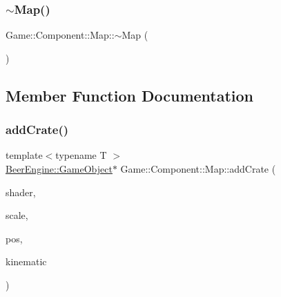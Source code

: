 \mbox{\label{class_game_1_1_component_1_1_map_a275fd057bb57bdfc5c35651d8cc3a464}} 
\subsubsection{\texorpdfstring{$\sim$\+Map()}{~Map()}}
{\footnotesize\ttfamily Game\+::\+Component\+::\+Map\+::$\sim$\+Map (\begin{DoxyParamCaption}{ }\end{DoxyParamCaption})}



\subsection{Member Function Documentation}
\mbox{\label{class_game_1_1_component_1_1_map_a860f2c45a23d20303aa5e04261ac462d}} 
\subsubsection{\texorpdfstring{add\+Crate()}{addCrate()}}
{\footnotesize\ttfamily template$<$typename T $>$ \\
\mbox{\hyperlink{class_beer_engine_1_1_game_object}{Beer\+Engine\+::\+Game\+Object}}$\ast$ Game\+::\+Component\+::\+Map\+::add\+Crate (\begin{DoxyParamCaption}\item[{\mbox{\hyperlink{class_beer_engine_1_1_graphics_1_1_shader_program}{Beer\+Engine\+::\+Graphics\+::\+Shader\+Program}} $\ast$}]{shader,  }\item[{glm\+::vec3}]{scale,  }\item[{glm\+::vec3}]{pos,  }\item[{\mbox{\hyperlink{namespace_beer_engine_1_1_component_a2cfe279cc309b6420e792597940b8a33}{Beer\+Engine\+::\+Component\+::\+R\+B\+Type}}}]{kinematic }\end{DoxyParamCaption})\hspace{0.3cm}{\ttfamily [inline]}}

